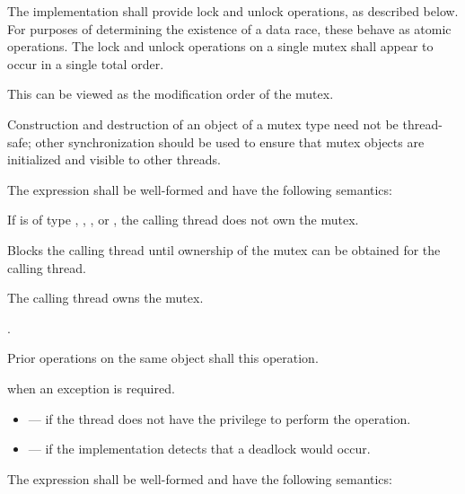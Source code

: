 \pnum
The implementation shall provide lock and unlock operations, as described below.
For purposes of determining the existence of a data race, these behave as
atomic operations. The lock and unlock operations on
a single mutex shall appear to occur in a single total order. \begin{note} This
can be viewed as the modification order of the
mutex. \end{note}
\begin{note} Construction and
destruction of an object of a mutex type need not be thread-safe; other
synchronization should be used to ensure that mutex objects are initialized
and visible to other threads. \end{note}

\pnum
The expression  shall be well-formed and have the following semantics:

\begin{itemdescr}
\pnum
\requires If  is of type , ,
, or , the calling
thread does not own the mutex.

\pnum
\effects Blocks the calling thread until ownership of the mutex can be obtained for the calling thread.

\pnum
\postconditions The calling thread owns the mutex.

\pnum
\returntype {}.

\pnum
\sync Prior  operations on the same object shall
 this operation.

\pnum
\throws {} when
an exception is required.

\pnum \errors
\begin{itemize}
\item {} --- if the thread does not have the
privilege to perform the operation.

\item {} --- if the implementation detects
that a deadlock would occur.
\end{itemize}
\end{itemdescr}

\pnum
The expression  shall be well-formed and have the following semantics:

